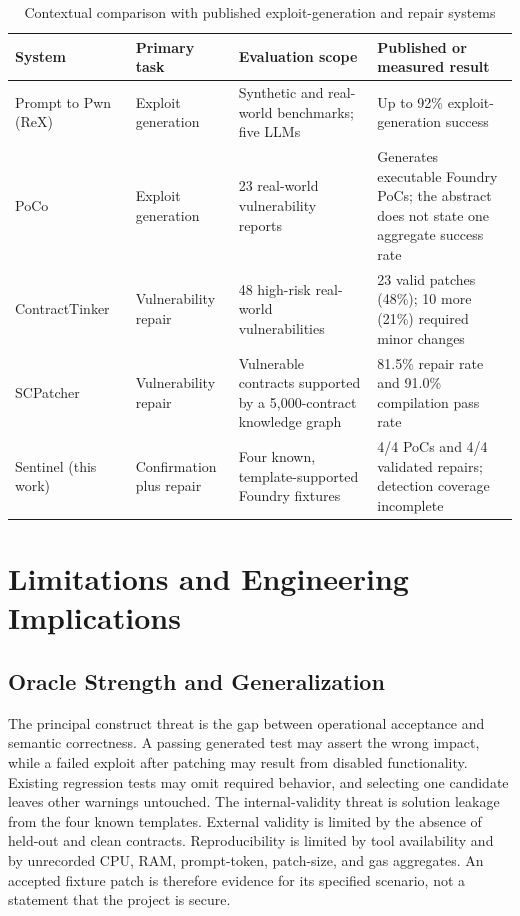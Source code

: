 \documentclass[conference,a4paper,10pt]{IEEEtran}
\begin{document}
\begin{table}[t]
\caption{Contextual comparison with published exploit-generation and repair systems}
\label{tab:comparison}
\centering\footnotesize
\begin{tabularx}{\textwidth}{@{}p{2.15cm}p{2.55cm}p{4.25cm}Y@{}}
\toprule
System & Primary task & Evaluation scope & Published or measured result\\
\midrule
Prompt to Pwn (ReX)~\cite{prompttopwn} & Exploit generation & Synthetic and real-world benchmarks; five LLMs & Up to 92\% exploit-generation success\\
PoCo~\cite{poco} & Exploit generation & 23 real-world vulnerability reports & Generates executable Foundry PoCs; the abstract does not state one aggregate success rate\\
ContractTinker~\cite{contracttinker} & Vulnerability repair & 48 high-risk real-world vulnerabilities & 23 valid patches (48\%); 10 more (21\%) required minor changes\\
SCPatcher~\cite{scpatcher} & Vulnerability repair & Vulnerable contracts supported by a 5,000-contract knowledge graph & 81.5\% repair rate and 91.0\% compilation pass rate\\
Sentinel (this work) & Confirmation plus repair & Four known, template-supported Foundry fixtures & 4/4 PoCs and 4/4 validated repairs; detection coverage incomplete\\
\bottomrule
\end{tabularx}
\end{table}

\section{Limitations and Engineering Implications}
\subsection{Oracle Strength and Generalization}
The principal construct threat is the gap between operational acceptance and semantic correctness. A passing generated test may assert the wrong impact, while a failed exploit after patching may result from disabled functionality. Existing regression tests may omit required behavior, and selecting one candidate leaves other warnings untouched. The internal-validity threat is solution leakage from the four known templates. External validity is limited by the absence of held-out and clean contracts. Reproducibility is limited by tool availability and by unrecorded CPU, RAM, prompt-token, patch-size, and gas aggregates. An accepted fixture patch is therefore evidence for its specified scenario, not a statement that the project is secure.
\end{document}
